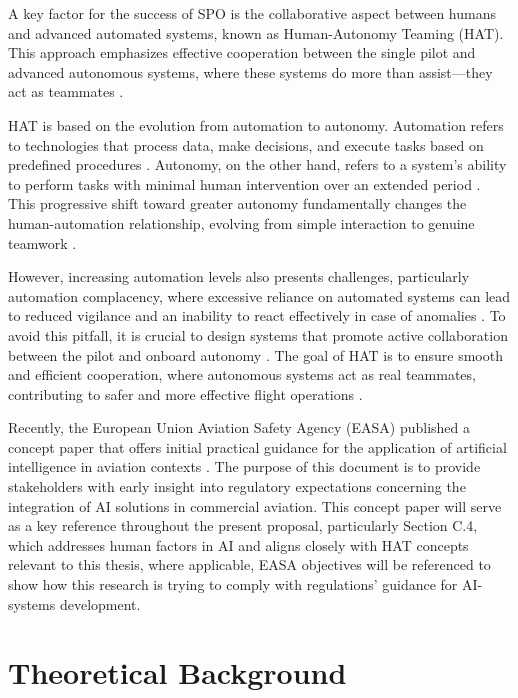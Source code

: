 \documentclass[12pt,a4paper]{article} %
\begin{document}
	A key factor for the success of SPO is the collaborative aspect between humans and advanced automated systems, known as Human-Autonomy Teaming (HAT). This approach emphasizes effective cooperation between the single pilot and advanced autonomous systems, where these systems do more than assist—they act as teammates \parencite{shively_autonomy_2017}.
	
	HAT is based on the evolution from automation to autonomy. Automation refers to technologies that process data, make decisions, and execute tasks based on predefined procedures \parencite{hoff_trust_2015, hancock_imposing_2017}. Autonomy, on the other hand, refers to a system's ability to perform tasks with minimal human intervention over an extended period \parencite{endsley_here_2017, holbrook_enabling_2020}. This progressive shift toward greater autonomy fundamentally changes the human-automation relationship, evolving from simple interaction to genuine teamwork \parencite{endsley_here_2017}.
	
	However, increasing automation levels also presents challenges, particularly automation complacency, where excessive reliance on automated systems can lead to reduced vigilance and an inability to react effectively in case of anomalies \parencite{lee_design_2023}. To avoid this pitfall, it is crucial to design systems that promote active collaboration between the pilot and onboard autonomy \parencite{endsley_here_2017}. The goal of HAT is to ensure smooth and efficient cooperation, where autonomous systems act as real teammates, contributing to safer and more effective flight operations \parencite{mcneese_chapter_2020}.

	Recently, the European Union Aviation Safety Agency (EASA) published a concept paper that offers initial practical guidance for the application of artificial intelligence in aviation contexts \parencite{easa_guidance_2024}. The purpose of this document is to provide stakeholders with early insight into regulatory expectations concerning the integration of AI solutions in commercial aviation. This concept paper will serve as a key reference throughout the present proposal, particularly Section C.4, which addresses human factors in AI and aligns closely with HAT concepts relevant to this thesis, where applicable, EASA objectives will be referenced to show how this research is trying to comply with regulations' guidance for AI-systems development.

	\section{Theoretical Background}
\end{document}
